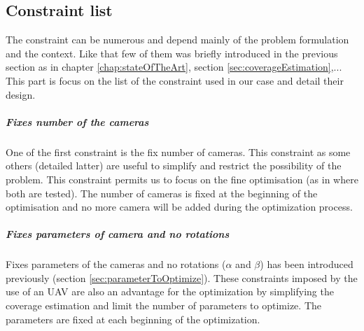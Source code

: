 \subsection{Constraint list}\label{sec:constraint}

 The constraint can be numerous and depend mainly of the problem formulation and the context. Like that few of them was briefly introduced in the previous section as in chapter \ref{chap:stateOfTheArt}, section \ref{sec:coverageEstimation},... This part is focus on the list of the constraint used in our case and detail their design.

%
\subparagraph{Fixes number of the cameras}
One of the first constraint is the fix number of cameras. This constraint as some others (detailed latter) are  useful to simplify and restrict the possibility of the problem. This constraint permits us to focus on the fine optimisation (as in \citep{22*zhao2008} where both are tested). The number of cameras is fixed at the beginning of the optimisation and no more camera will be added during the optimization process.  

\subparagraph{Fixes parameters of camera and no rotations}
Fixes parameters of the cameras and no rotations ($\alpha$ and $\beta$) has been introduced previously (section \ref{sec:parameterToOptimize}). These constraints imposed by the use of an UAV are also an advantage for the optimization by simplifying the coverage estimation and limit the number of parameters to optimize. The parameters are fixed at each beginning of the optimization.

